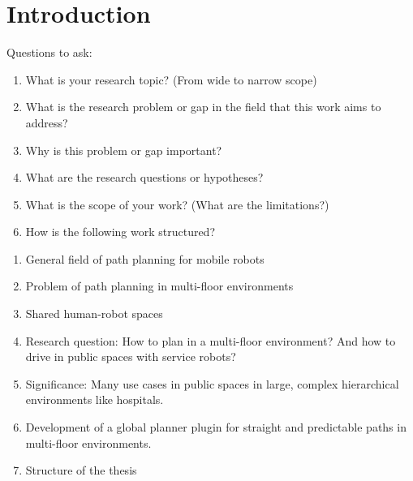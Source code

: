 \chapter{Introduction}
\label{sec:introduction}
Questions to ask:
\begin{enumerate}
    \item What is your research topic? (From wide to narrow scope)
    \item What is the research problem or gap in the field that this work aims to address?
    \item Why is this problem or gap important?
    \item What are the research questions or hypotheses? 
    \item What is the scope of your work? (What are the limitations?)
    \item How is the following work structured?
\end{enumerate}

\begin{enumerate}
    \item General field of path planning for mobile robots
    \item Problem of path planning in multi-floor environments
    \item Shared human-robot spaces
    \item Research question: How to plan in a multi-floor environment? And how to drive in public spaces with service robots?
    \item Significance: Many use cases in public spaces in large, complex hierarchical environments like hospitals.
    \item Development of a global planner plugin for straight and predictable paths in multi-floor environments.
    \item Structure of the thesis
\end{enumerate}

